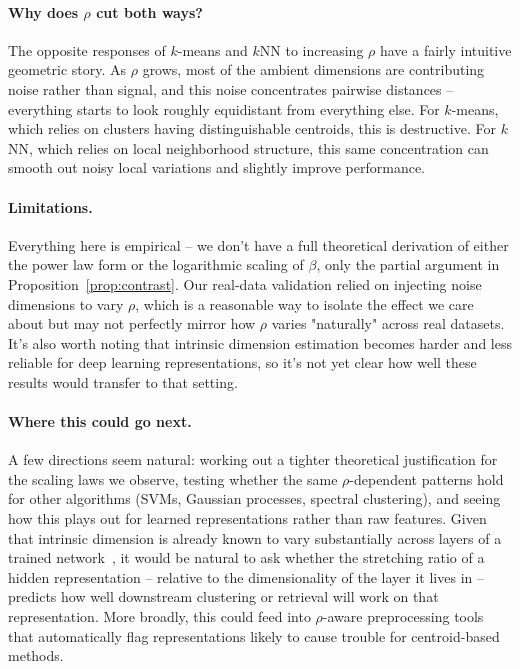 \documentclass[pdflatex,sn-mathphys-num]{sn-jnl}
\theoremstyle{thmstyleone}
\begin{document}
\paragraph{Why does $\rho$ cut both ways?}
The opposite responses of $k$-means and $k$NN to increasing $\rho$ have a fairly
intuitive geometric story. As $\rho$ grows, most of the ambient dimensions are
contributing noise rather than signal, and this noise concentrates pairwise
distances -- everything starts to look roughly equidistant from everything
else. For $k$-means, which relies on clusters having distinguishable centroids,
this is destructive. For $k$NN, which relies on local neighborhood structure,
this same concentration can smooth out noisy local variations and slightly
improve performance.

\paragraph{Limitations.}
Everything here is empirical -- we don't have a full theoretical derivation of
either the power law form or the logarithmic scaling of $\beta$, only the
partial argument in Proposition~\ref{prop:contrast}. Our real-data validation
relied on injecting noise dimensions to vary $\rho$, which is a reasonable way
to isolate the effect we care about but may not perfectly mirror how $\rho$
varies "naturally" across real datasets. It's also worth noting that intrinsic
dimension estimation becomes harder and less reliable for deep learning
representations, so it's not yet clear how well these results would transfer to
that setting.

\paragraph{Where this could go next.}
A few directions seem natural: working out a tighter theoretical justification
for the scaling laws we observe, testing whether the same $\rho$-dependent
patterns hold for other algorithms (SVMs, Gaussian processes, spectral
clustering), and seeing how this plays out for learned representations rather
than raw features. Given that intrinsic dimension is already known to vary
substantially across layers of a trained network~\cite{ansuini2019,pope2021},
it would be natural to ask whether the stretching ratio of a hidden
representation -- relative to the dimensionality of the layer it lives in --
predicts how well downstream clustering or retrieval will work on that
representation. More broadly, this could feed into $\rho$-aware preprocessing
tools that automatically flag representations likely to cause trouble for
centroid-based methods.
\end{document}
